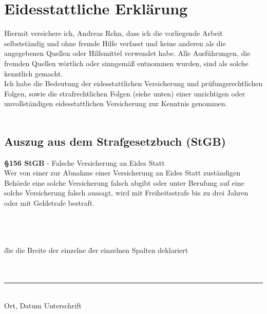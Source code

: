 \chapter*{Eidesstattliche Erklärung}
Hiermit versichere ich, Andreas Rehn, dass ich die vorliegende Arbeit selbstständig und ohne fremde Hilfe verfasst und keine anderen als die angegebenen Quellen oder Hilfsmittel verwendet habe. Alle Ausführungen, die fremden Quellen wörtlich oder sinngemäß entnommen wurden, sind als solche kenntlich gemacht.\\
Ich habe die Bedeutung der eidesstattlichen Versicherung und prüfungsrechtlichen Folgen, sowie die strafrechtlichen Folgen (siehe unten) einer unrichtigen oder unvollständigen eidesstattlichen Versicherung zur Kenntnis genommen.
\\
\\
\section*{Auszug aus dem Strafgesetzbuch (StGB)}
\textbf{§156 StGB} - Falsche Versicherung an Eides Statt\\
Wer von einer zur Abnahme einer Versicherung an Eides Statt zuständigen Behörde eine solche Versicherung falsch abgibt oder unter Berufung auf eine solche Versicherung falsch aussagt, wird mit Freiheitsstrafe bis zu drei Jahren oder mit Geldstrafe bestraft.
\\
\\
\\
\\
\begin{tabbing}
\jahr \= die die Breite der einzelne \= der einzelnen Spalten deklariert \kill %
\jahr \> \> \fullname \\
\\
\\
\noindent\rule{\textwidth}{1pt}\\
Ort, Datum \> \> Unterschrift \\
\end{tabbing}